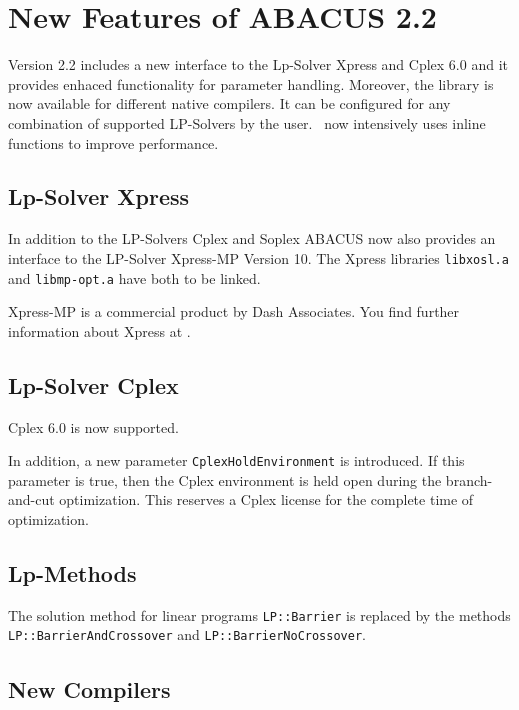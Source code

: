 \section{New Features of ABACUS 2.2}
\label{section:new22}


Version 2.2 includes a new interface to the Lp-Solver
Xpress and Cplex 6.0 and it provides enhaced functionality
for parameter handling.
Moreover, the library is now available for different native compilers.
It can be configured for any combination of supported LP-Solvers by the
user.
\ABACUS\ now intensively uses inline functions to improve performance.

\subsection{Lp-Solver Xpress}

In addition to the LP-Solvers Cplex and Soplex ABACUS now also provides
an interface to the LP-Solver Xpress-MP Version 10.
The Xpress libraries {\tt libxosl.a} and {\tt libmp-opt.a} have both to
be linked.

Xpress-MP is a commercial product by Dash Associates. You find further
information about Xpress at
.

\subsection{Lp-Solver Cplex}

Cplex 6.0 is now supported.

In addition, a new parameter {\tt CplexHoldEnvironment} is introduced.
If this parameter is true, then the Cplex environment 
is held open during the branch-and-cut optimization.
This reserves a Cplex license for the complete time of
optimization.

\subsection{Lp-Methods}

\begin{sloppypar}
The solution method for linear programs
{\tt LP::Barrier} is replaced by the methods
{\tt LP::BarrierAndCrossover} and {\tt LP::BarrierNoCrossover}.
\end{sloppypar}

\subsection{New Compilers}

